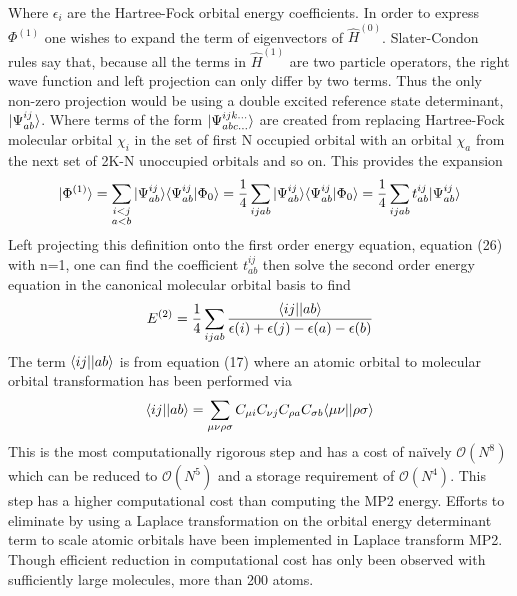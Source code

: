        Where $\epsilon_i$ are the Hartree-Fock orbital energy coefficients. In order to express $\Phi^{(1)}$ one wishes to expand the term of eigenvectors of $\hat{H}^{(0)}$.  Slater-Condon rules\cite{Szabo 1982} say that, because all the terms in $\hat{H}^{(1)}$ are two particle operators, the right wave function and left projection can only differ by two terms.  Thus the only non-zero projection would be using a double excited reference state determinant, $| \Psi^{ij}_{ab} \rangle$. Where terms of the form $| \Psi^{ijk\dots}_{abc\dots} \rangle$ are created from replacing Hartree-Fock molecular orbital $\chi_i$ in the set of first N occupied orbital with an orbital $\chi_a$ from the next set of 2K-N unoccupied orbitals and so on.  This provides the expansion 
         \begin{equation}
          | \Phi^{(1)} \rangle = \sum_{\substack{i<j\\a<b}} | \Psi^{ij}_{ab} \rangle \langle\Psi^{ij}_{ab}|\Phi_0\rangle  = \frac{1}{4} \sum_{ijab} | \Psi^{ij}_{ab} \rangle \langle\Psi^{ij}_{ab}|\Phi_0\rangle = \frac{1}{4}\sum_{ijab} t^{ij}_{ab} | \Psi^{ij}_{ab} \rangle
        \end{equation}
      Left projecting this definition onto the first order energy equation, equation (26) with n=1, one can find the coefficient $t^{ij}_{ab}$ then solve the second order energy equation in the canonical molecular orbital basis to find
        \begin{equation}
          E^{(2)} = \frac{1}{4} \sum_{ijab} \frac{\langle ij || ab \rangle}{\epsilon{(i) + \epsilon(j) - \epsilon(a) - \epsilon(b)}}
        \end{equation}
      The term $\langle ij || ab \rangle$ is from equation (17) where an atomic orbital to molecular orbital transformation has been performed via
        \begin{equation}
          \langle ij || ab \rangle = \sum_{\mu\nu\rho\sigma} C_{\mu i} C_{\nu j} C_{\rho a} C_{\sigma b} \langle\mu \nu | | \rho \sigma \rangle
        \end{equation}
      This is the most computationally rigorous step and has a cost of na{\"i}vely $\mathcal{O}(N^8)$ which can be reduced to $\mathcal{O}(N^5)$ and a storage requirement of $\mathcal{O}(N^4)$.  This step has a higher computational cost than computing the MP2 energy.  Efforts to eliminate by using a Laplace transformation on the orbital energy determinant term to scale atomic orbitals have been implemented in Laplace transform MP2\cite{almof 1991, Haser 1992}.  Though efficient reduction in computational cost has only been observed with sufficiently large molecules, more than 200 atoms.
        
